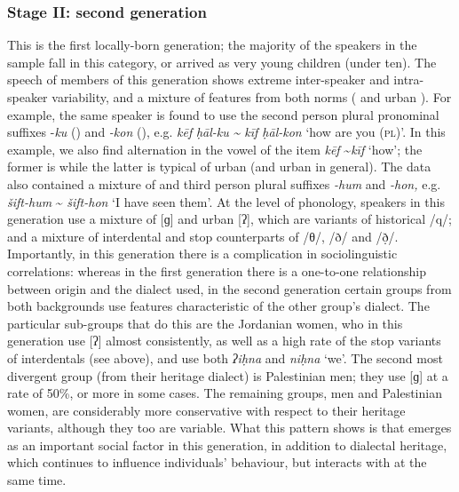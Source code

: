\documentclass[output=paper]{langsci/langscibook}
\begin{document}
\subsubsection{Stage II: second generation}
This is the first locally-born generation; the majority of the speakers in the sample fall in this category, or arrived as very young children (under ten). The speech of members of this generation shows extreme inter-speaker and intra-speaker variability, and a mixture of features from both norms ( and urban ). For example, the same speaker is found to use the second person plural pronominal suffixes -\textit{ku} () and \textit{{}-kon} (), e.g. \textit{kēf} \textit{ḥāl-ku} \textit{{\textasciitilde} kīf ḥāl-kon} ‘how are you (\textsc{pl})'. In this example, we also find alternation in the vowel of the item \textit{kēf} {\textasciitilde}\textit{kīf} ‘how’; the former is  while the latter is typical of urban  (and urban  in general). The data also contained a mixture of  and  third person plural suffixes \textit{{}-hum} and \textit{\--hon,} e.g. \textit{šift-hum} {\textasciitilde} \textit{šift-hon} ‘I have seen them’. At the level of phonology, speakers in this generation use a mixture of  [ɡ] and urban  [ʔ], which are variants of historical /q/; and a mixture of interdental and stop counterparts of /θ/, /ð/ and /ð̣/. Importantly, in this generation there is a complication in sociolinguistic correlations: whereas in the first generation there is a one-to-one relationship between origin and the dialect used, in the second generation certain groups from both backgrounds use features characteristic of the other group’s dialect. The particular sub-groups that do this are the Jordanian women, who in this generation use  [ʔ] almost consistently, as well as a high rate of the stop variants of interdentals (see above), and use both  \textit{ʔiḥna} and  \textit{niḥna} ‘we’. The second most divergent group (from their heritage dialect) is Palestinian men; they use  [ɡ] at a rate of 50\%, or more in some cases. The remaining groups,  men and Palestinian women, are considerably more conservative with respect to their heritage variants, although they too are variable. What this pattern shows is that  emerges as an important social factor in this generation, in addition to dialectal heritage, which continues to influence individuals’ behaviour, but interacts with  at the same time. 
\end{document}
